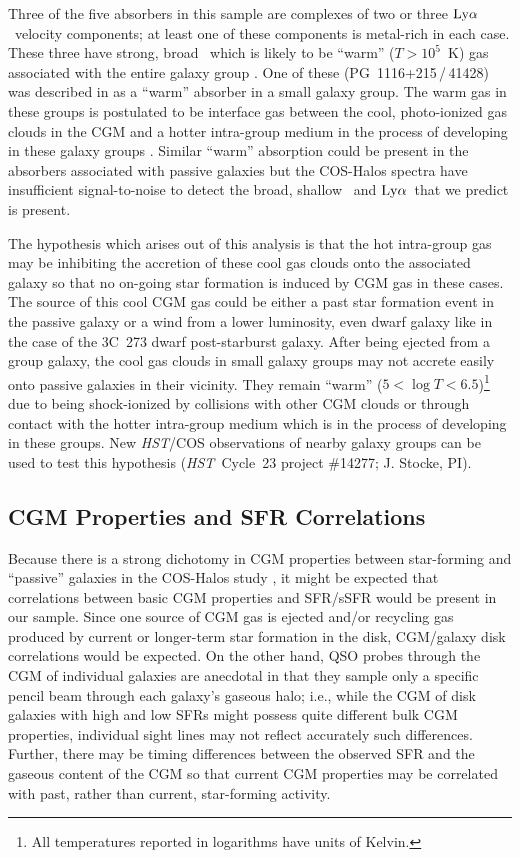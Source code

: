 \documentclass[twocolumn,twocolappendix,tighten,times]{aastex6}
\newcommand{\OVI}{\ion{O}{6}}
\newcommand{\hst}{{\sl HST}}
\newcommand{\lya}{\ensuremath{{\rm Ly}\alpha}}
\begin{document}
Three of the five absorbers in this sample are complexes of two or three \lya\ 
velocity components; at least one of these components is metal-rich in each case. 
These three have strong, broad \OVI\ which is likely to be ``warm'' ($T>10^5$~K) 
gas associated with the entire galaxy group \citep{stocke14}. One of these 
(PG~1116+215\,/\,41428) was described in \citet{stocke14} as a ``warm'' absorber 
in a small galaxy group. The warm gas in these groups is postulated to be interface 
gas between the cool, photo-ionized gas clouds in the CGM and a hotter intra-group 
medium in the process of developing in these galaxy groups \citep{stocke14}. 
Similar ``warm'' absorption could be present in the \citet{thom12} absorbers 
associated with passive galaxies but the COS-Halos spectra have insufficient 
signal-to-noise to detect the broad, shallow \OVI\ and \lya\ that we predict is 
present.

The hypothesis which arises out of this analysis is that the hot intra-group gas 
may be inhibiting the accretion of these cool gas clouds onto the associated 
galaxy so that no on-going star formation is induced by CGM gas in these 
cases. The source of this cool CGM gas could be either a past star formation event 
in the passive galaxy or a wind from a lower luminosity, even dwarf galaxy like 
in the case of the 3C~273 dwarf post-starburst galaxy. After being ejected from 
a group galaxy, the cool gas clouds in small galaxy groups may not accrete easily 
onto passive galaxies in their vicinity. They remain ``warm'' 
($5<\log{T}<6.5$)\footnote{All temperatures reported in logarithms 
have units of Kelvin.} due to being shock-ionized by collisions with other CGM 
clouds or through contact with the hotter intra-group medium which is in the 
process of developing in these groups. New \hst/COS observations of nearby galaxy 
groups can be used to test this hypothesis (\hst\ Cycle~23 project \#14277; J. 
Stocke, PI).



\subsection{CGM Properties and SFR Correlations}
\label{discussion:SFR}

Because there is a strong dichotomy in CGM properties between star-forming and 
``passive'' galaxies in the COS-Halos study \citep{tumlinson11,thom12}, it might 
be expected that correlations between basic CGM properties and SFR/sSFR would be 
present in our sample. Since one source of CGM gas is ejected and/or recycling gas 
produced by current or longer-term star formation in the disk, CGM/galaxy disk 
correlations would be expected. On the other hand, QSO probes through the CGM of 
individual galaxies are anecdotal in that they sample only a specific pencil beam 
through each galaxy's gaseous halo; i.e., while the CGM of disk galaxies with high 
and low SFRs might possess quite different bulk CGM properties, individual sight 
lines may not reflect accurately such differences. Further, there may be timing 
differences between the observed SFR and the gaseous content of the CGM so that 
current CGM properties may be correlated with past, rather than current, star-forming 
activity.
\end{document}
